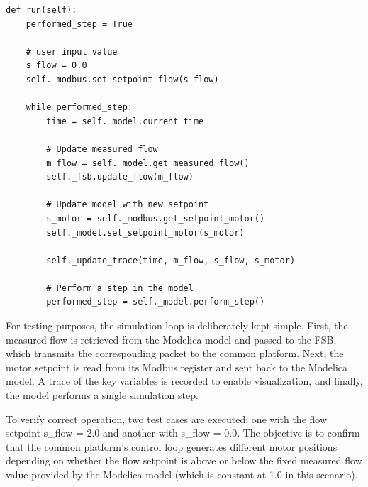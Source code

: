 \documentclass[we,final,11pt,oneside,openany]{uantwerpenbamathesis}
\begin{document}
\begin{lstlisting}[style=pythonstyle, caption={Simulation loop}]
def run(self):
    performed_step = True

    # user input value
    s_flow = 0.0
    self._modbus.set_setpoint_flow(s_flow)

    while performed_step:
        time = self._model.current_time

        # Update measured flow
        m_flow = self._model.get_measured_flow()
        self._fsb.update_flow(m_flow)

        # Update model with new setpoint
        s_motor = self._modbus.get_setpoint_motor()
        self._model.set_setpoint_motor(s_motor)

        self._update_trace(time, m_flow, s_flow, s_motor)

        # Perform a step in the model
        performed_step = self._model.perform_step()
\end{lstlisting}

For testing purposes, the simulation loop is deliberately kept simple.
First, the measured flow is retrieved from the Modelica model and passed to the FSB, which transmits the corresponding packet to the common platform.
Next, the motor setpoint is read from its Modbus register and sent back to the Modelica model.
A trace of the key variables is recorded to enable visualization, and finally, the model performs a single simulation step.

To verify correct operation, two test cases are executed: one with the flow setpoint s\_flow = 2.0 and another with s\_flow = 0.0.
The objective is to confirm that the common platform’s control loop generates different motor positions depending on whether the flow setpoint is above or below the fixed measured flow value provided by the Modelica model (which is constant at 1.0 in this scenario).
\end{document}
